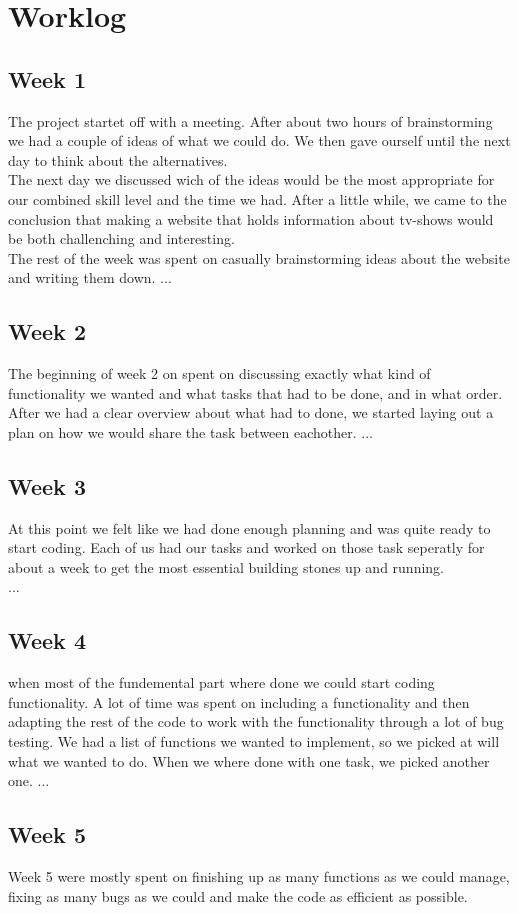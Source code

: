 \section{Worklog}
\subsection{Week 1}
The project startet off with a meeting. After about two hours of brainstorming we had a couple of ideas of what we could do. We then gave ourself until the next day to think about the alternatives. \\
The next day we discussed wich of the ideas would be the most appropriate for our combined skill level and the time we had. After a little while, we came to the conclusion that making a website that holds information about tv-shows would be both challenching and interesting.\\

The rest of the week was spent on casually brainstorming ideas about the website and writing them down.
...
\subsection{Week 2}

The beginning of week 2 on spent on discussing exactly what kind of functionality we wanted and what tasks that had to be done, and in what order.
After we had a clear overview about what had to done, we started laying out a plan on how we would share the task between eachother.
...
\subsection{Week 3}
At this point we felt like we had done enough planning and was quite ready to start coding. Each of us had our tasks and worked on those task seperatly for about a week to get the most essential building stones up and running.\\
...
\subsection{Week 4}
when most of the fundemental part where done we could start coding functionality. A lot of time was spent on including a functionality and then adapting the rest of the code to work with the functionality through a lot of bug testing. We had a list of functions we wanted to implement, so we picked at will what we wanted to do. When we where done with one task, we picked another one.
...
\subsection{Week 5}
Week 5 were mostly spent on finishing up as many functions as we could manage, fixing as many bugs as we could and make the code as efficient as possible.\\

